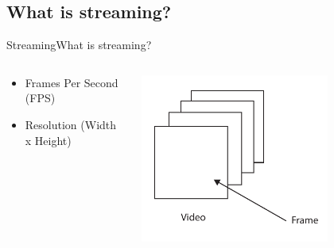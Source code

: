 \author{Thomas Kobber Panum}
\subsection{What is streaming?}
\begin{frame}{Streaming}{What is streaming?}
  \begin{columns}[T]
    \begin{column}{.5\textwidth}
     \begin{block}{}
    \begin{itemize}
      \item Frames Per Second (FPS)
      \item Resolution (Width x Height)
    \end{itemize}
    \end{block}
    \end{column}
    \begin{column}{.5\textwidth}
    \begin{block}{}
    \begin{center}
    \includegraphics[width=0.7\textwidth]{images/video_structure.pdf}
    \end{center}
    \end{block}
    \end{column}
  \end{columns}
\end{frame}